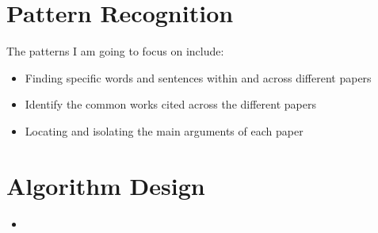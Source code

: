\documentclass{article}
\begin{document}
\section{Pattern Recognition}

The patterns I am going to focus on include:

\begin{itemize}
    \item Finding specific words and sentences within and across different papers
    \item Identify the common works cited across the different papers
    \item Locating and isolating the main arguments of each paper
\end{itemize}

\section{Algorithm Design}

\begin{itemize}
    \item 
\end{itemize}
\end{document}
